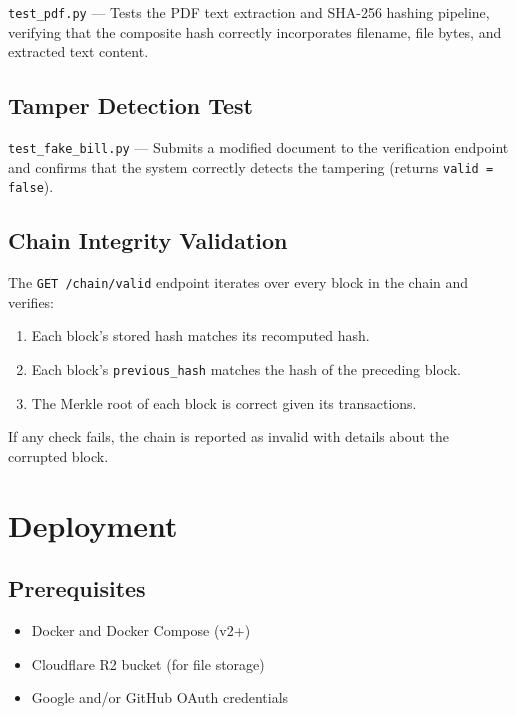 \documentclass[12pt, a4paper]{report}
\begin{document}
\texttt{test\_pdf.py} — Tests the PDF text extraction and SHA-256 hashing
pipeline, verifying that the composite hash correctly incorporates filename,
file bytes, and extracted text content.

\section{Tamper Detection Test}

\texttt{test\_fake\_bill.py} — Submits a modified document to the verification
endpoint and confirms that the system correctly detects the tampering (returns
\texttt{valid = false}).

\section{Chain Integrity Validation}

The \texttt{GET /chain/valid} endpoint iterates over every block in the chain
and verifies:
\begin{enumerate}
    \item Each block's stored hash matches its recomputed hash.
    \item Each block's \texttt{previous\_hash} matches the hash of the
          preceding block.
    \item The Merkle root of each block is correct given its transactions.
\end{enumerate}

If any check fails, the chain is reported as invalid with details about the
corrupted block.


\chapter{Deployment}

\section{Prerequisites}

\begin{itemize}
    \item Docker and Docker Compose (v2+)
    \item Cloudflare R2 bucket (for file storage)
    \item Google and/or GitHub OAuth credentials
\end{itemize}
\end{document}
